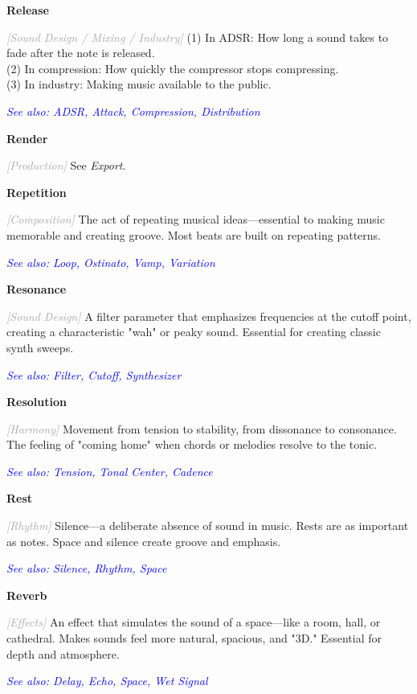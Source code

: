 \documentclass[11pt,letterpaper]{article}
\newcommand{\term}[1]{\textbf{\large\color{purple}#1}}
\newcommand{\category}[1]{\textcolor{darkgray}{\textit{\small [#1]}}}
\newcommand{\seealso}[1]{\textcolor{blue}{\textit{See also: #1}}}
\newenvironment{termdef}[1]
  {\noindent\term{#1}\par\nopagebreak}
  {\par\vspace{0.3em}}
\begin{document}
\begin{termdef}{Release}
\category{Sound Design / Mixing / Industry}
(1) In ADSR: How long a sound takes to fade after the note is released. \\
(2) In compression: How quickly the compressor stops compressing. \\
(3) In industry: Making music available to the public.

\seealso{ADSR, Attack, Compression, Distribution}
\end{termdef}

\begin{termdef}{Render}
\category{Production}
See \textit{Export}.
\end{termdef}

\begin{termdef}{Repetition}
\category{Composition}
The act of repeating musical ideas—essential to making music memorable and creating groove. Most beats are built on repeating patterns.

\seealso{Loop, Ostinato, Vamp, Variation}
\end{termdef}

\begin{termdef}{Resonance}
\category{Sound Design}
A filter parameter that emphasizes frequencies at the cutoff point, creating a characteristic "wah" or peaky sound. Essential for creating classic synth sweeps.

\seealso{Filter, Cutoff, Synthesizer}
\end{termdef}

\begin{termdef}{Resolution}
\category{Harmony}
Movement from tension to stability, from dissonance to consonance. The feeling of "coming home" when chords or melodies resolve to the tonic.

\seealso{Tension, Tonal Center, Cadence}
\end{termdef}

\begin{termdef}{Rest}
\category{Rhythm}
Silence—a deliberate absence of sound in music. Rests are as important as notes. Space and silence create groove and emphasis.

\seealso{Silence, Rhythm, Space}
\end{termdef}

\begin{termdef}{Reverb}
\category{Effects}
An effect that simulates the sound of a space—like a room, hall, or cathedral. Makes sounds feel more natural, spacious, and "3D." Essential for depth and atmosphere.

\seealso{Delay, Echo, Space, Wet Signal}
\end{termdef}
\end{document}
